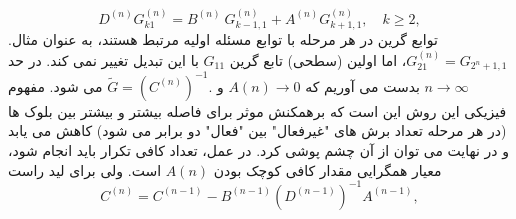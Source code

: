 \begin{equation}
	{{D}^{(n)}}G_{k1}^{(n)}={{B}^{(n)}}\ G_{k-1,1}^{(n)}+{{A}^{(n)}}G_{k+1,1}^{(n)},\quad k\ge 2,
\end{equation}
توابع گرین در هر مرحله با توابع مسئله اولیه مرتبط هستند، به عنوان مثال. $G_{21}^{(n)}={{G}_{{{2}^{n}}+1,1}}$، اما اولین (سطحی) تابع گرین $G_{11}$ با این تبدیل تغییر نمی کند.
در حد $n\to\infty$ بدست می آوریم که $A(n) \rightarrow 0$ و $\tilde{G}={{\left( {{C}^{(n)}} \right)}^{-1}}.$ می شود. مفهوم فیزیکی این روش این است که برهمکنش موثر برای فاصله بیشتر و بیشتر بین بلوک ها (در هر مرحله تعداد برش های "غیرفعال" بین "فعال" دو برابر می شود) کاهش می یابد و در نهایت می توان از آن چشم پوشی کرد. در عمل، تعداد کافی تکرار باید انجام شود، معیار همگرایی مقدار کافی کوچک بودن $A(n)$ است.
ولی برای لید راست 
\begin{equation}
    {{C}^{(n)}}={{C}^{(n-1)}}-{{B}^{(n-1)}}{{({{D}^{(n-1)}})}^{-1}}{{A}^{(n-1)}},
\end{equation}


